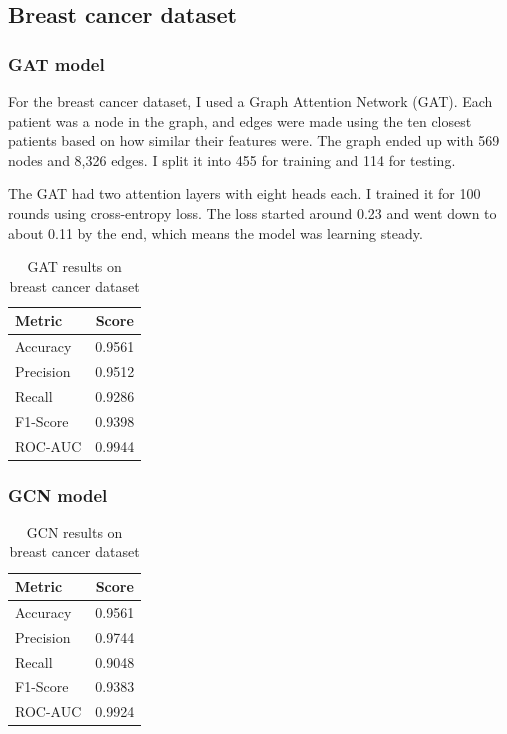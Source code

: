 \documentclass[12pt]{article}
\begin{document}
\subsection{Breast cancer dataset}
\subsubsection{GAT model}

For the breast cancer dataset, I used a Graph Attention Network (GAT). Each patient was a node in the graph, and edges were made using the ten closest patients based on how similar their features were. The graph ended up with 569 nodes and 8,326 edges. I split it into 455 for training and 114 for testing.

The GAT had two attention layers with eight heads each. I trained it for 100 rounds using cross-entropy loss. The loss started around 0.23 and went down to about 0.11 by the end, which means the model was learning steady.

\begin{table}[H]
\centering
\caption{GAT results on breast cancer dataset}
\begin{tabular}{|l|c|}
\hline
\textbf{Metric} & \textbf{Score} \\
\hline
Accuracy  & 0.9561 \\
Precision & 0.9512 \\
Recall    & 0.9286 \\
F1-Score  & 0.9398 \\
ROC-AUC   & 0.9944 \\
\hline
\end{tabular}
\end{table}


\subsubsection{GCN model}



\begin{table}[H]
\centering
\caption{GCN results on breast cancer dataset}
\begin{tabular}{|l|c|}
\hline
\textbf{Metric} & \textbf{Score} \\
\hline
Accuracy  & 0.9561 \\
Precision & 0.9744 \\
Recall    & 0.9048 \\
F1-Score  & 0.9383 \\
ROC-AUC   & 0.9924 \\
\hline
\end{tabular}

\end{table}
\end{document}
